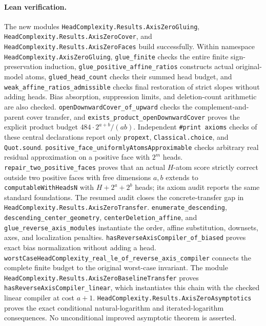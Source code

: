 \documentclass[11pt]{article}
\begin{document}
\paragraph{Lean verification.}
The new modules \texttt{HeadComplexity.Results.AxisZeroGluing},
\texttt{HeadComplexity.Results.AxisZeroCover}, and
\texttt{HeadComplexity.Results.AxisZeroFaces} build successfully.
Within namespace \texttt{HeadComplexity.AxisZeroGluing},
\texttt{glue\_finite} checks the entire finite sign-preservation induction,
\texttt{glue\_positive\_affine\_ratios} constructs actual original-model
atoms, \texttt{glued\_head\_count} checks their summed head budget,
and \texttt{weak\_affine\_ratios\_admissible} checks final restoration of
strict slopes without adding heads. Bias absorption, suppression limits,
and deletion-count arithmetic are also checked.
\texttt{openDownwardCover\_of\_upward} checks the complement-and-parent
cover transfer, and \texttt{exists\_product\_openDownwardCover} proves the
explicit product budget $484\cdot2^{a+b}/(ab)$.
Independent \texttt{\#print axioms} checks of these central declarations
report only \texttt{propext}, \texttt{Classical.choice}, and
\texttt{Quot.sound}. \texttt{positive\_face\_uniformlyAtomsApproximable}
checks arbitrary real residual approximation on a positive face with $2^m$
heads. \texttt{repair\_two\_positive\_faces} proves that an actual
$H$-atom score strictly correct outside two positive faces with free
dimensions $a,b$ extends to \texttt{computableWithHeadsN} with
$H+2^a+2^b$ heads; its axiom audit reports the same standard foundations.
The resumed audit closes the concrete-transfer gap in
\texttt{HeadComplexity.Results.AxisZeroTransfer}.
\texttt{enumerate\_descending}, \texttt{descending\_center\_geometry},
\texttt{centerDeletion\_affine}, and
\texttt{glue\_reverse\_axis\_modules} instantiate the order, affine
substitution, downsets, axes, and localization penalties.
\texttt{hasReverseAxisCompiler\_of\_biased} proves exact bias
normalization without adding a head.
\texttt{worstCaseHeadComplexity\_real\_le\_of\_reverse\_axis\_compiler}
connects the complete finite budget to the original worst-case invariant.
The module \texttt{HeadComplexity.Results.AxisZeroBaselineTransfer}
proves \texttt{hasReverseAxisCompiler\_linear}, which instantiates
this chain with the checked linear compiler at cost $a+1$.
\texttt{HeadComplexity.Results.AxisZeroAsymptotics} proves the exact
conditional natural-logarithm and iterated-logarithm consequences.
No unconditional improved asymptotic theorem is asserted.
\end{document}
